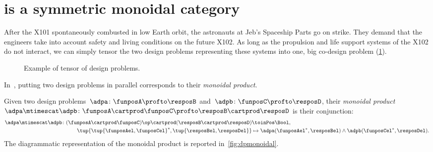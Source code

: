 

\section{\DP is a symmetric monoidal category}\label{sec:parallelism-DP-monoidal}


\begin{example}
    After the X101 spontaneously combusted in low Earth orbit, the astronauts at Jeb's Spaceship Parts go on strike.
    They demand that the engineers take into account safety and living conditions on the future X102. As long as the propulsion and life support systems of the X102 do not interact, we can simply tensor the two design problems representing these systems into one, big co-design problem (\cref{fig:examplemonoidal}).
    \begin{figure}[h!]
        \centering
        \caption{Example of tensor of design problems. }
        \label{fig:examplemonoidal}
    \end{figure}
\end{example}
In~\DP, putting two design problems in parallel corresponds to their \emph{monoidal product}.

\begin{definition}
    \label{def:monoidalproduct}
    Given two design problems~$\adpa \colon \funposA \profto \resposB$ and~$\adpb \colon \funposC \profto \resposD$, their \emph{monoidal product}~$\adpa \mtimescat \adpb \colon \funposA \cartprod \funposC \profto \resposB\cartprod \resposD$ is their conjunction:
    \begin{equation}
        \label{eq:monoidalprod_dp}
        \begin{aligned}
            \adpa \mtimescat \adpb \colon (\funposA \cartprod \funposC)\op \cartprod (\resposB \cartprod \resposD) & \toinPos \Bool, \\
            \tup{\tup{\funposAel,\funposCel}^*,\tup{\resposBel,\resposDel}} &\mapsto \adpa(\funposAel^*,\resposBel) \wedge \adpb(\funposCel^*,\resposDel).
        \end{aligned}
    \end{equation}
    The diagrammatic representation of the monoidal product is reported in~\cref{fig:dpmonoidal}.
\end{definition}

